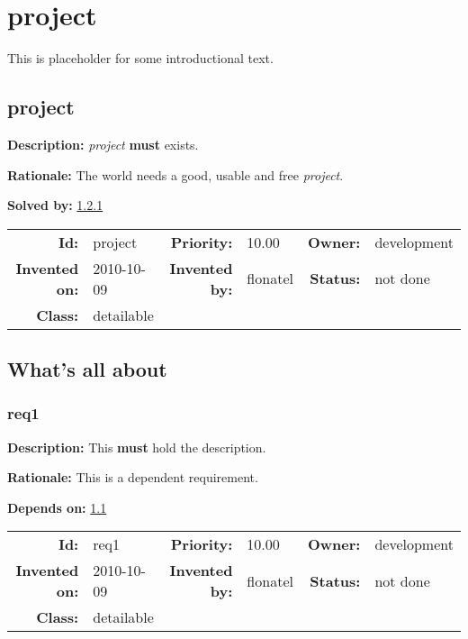 \chapter{project}
This is placeholder for some introductional text.
\section{project}\label{project}
\textbf{Description:} \textsl{project} \textbf{must} exists.

\textbf{Rationale:} The world needs a good, usable and free \textsl{project}.

\textbf{Solved by:} \ref{req1} 

\par
{\small \begin{center}\begin{tabular}{rlrlrl}
\textbf{Id:} & project  & \textbf{Priority:} & 10.00  & \textbf{Owner:} & development\\ 
\textbf{Invented on:} & 2010-10-09  & \textbf{Invented by:} & flonatel  & \textbf{Status:} & not done \\ 
\textbf{Class:} & detailable  & & & \end{tabular}\end{center} }

\section{What's all about}
\subsection{req1}\label{req1}
\textbf{Description:} This \textbf{must} hold the description.

\textbf{Rationale:} This is a dependent requirement.

\textbf{Depends on:} \ref{project} 

\par
{\small \begin{center}\begin{tabular}{rlrlrl}
\textbf{Id:} & req1  & \textbf{Priority:} & 10.00  & \textbf{Owner:} & development\\ 
\textbf{Invented on:} & 2010-10-09  & \textbf{Invented by:} & flonatel  & \textbf{Status:} & not done \\ 
\textbf{Class:} & detailable  & & & \end{tabular}\end{center} }

